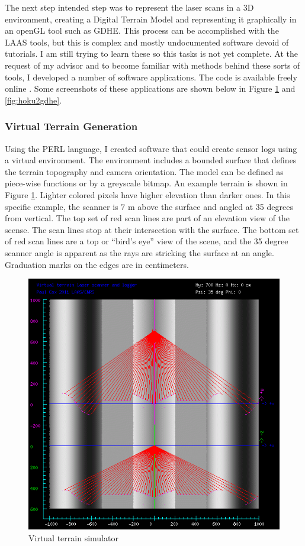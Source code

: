 \documentclass[a4paper,11pt]{report}
\begin{document}
The next step intended step was to represent the laser scans in a 3D environment, creating a Digital Terrain Model and representing it graphically in an openGL tool such as GDHE. This process can be accomplished with the LAAS tools, but this is complex and mostly undocumented software devoid of tutorials. I am still trying to learn these so this tasks is not yet complete. At the request of my advisor and to become familiar with methods behind these sorts of tools, I developed a number of software applications. The code is available freely online \cite{laserhawkgit}. Some screenshots of these applications are shown below in Figure \ref{fig:mkvirt} and \ref{fig:hoku2gdhe}.

\subsubsection{Virtual Terrain Generation}

Using the PERL language, I created software that could create sensor logs using a virtual environment. The environment includes a bounded surface that defines the terrain topography and camera orientation. The model can be defined as piece-wise functions or by a greyscale bitmap. An example terrain is shown in Figure \ref{fig:mkvirt}. Lighter colored pixels have higher elevation than darker ones. In this specific example, the scanner is 7 m above the surface and angled at 35 degrees from vertical. The top set of red scan lines are part of an elevation view of the scense. The scan lines stop at their intersection with the surface. The bottom set of red scan lines are a top or ``bird's eye'' view of the scene, and the 35 degree scanner angle is apparent as the rays are stricking the surface at an angle. Graduation marks on the edges are in centimeters.

\begin{figure}[ht]
 \centering
 \includegraphics[width=12cm]{Mkvirtsample.png}
 \caption{Virtual terrain simulator}
 \label{fig:mkvirt}
\end{figure}
\end{document}
